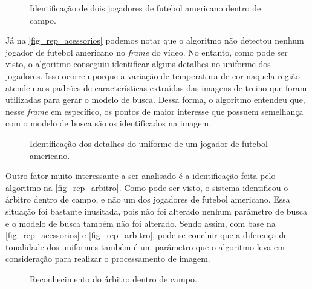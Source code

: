\begin{figure}[ht]
	\caption{\label{fig_rep_dois_jogadores}Identificação de dois jogadores de futebol americano dentro de campo.}
	\begin{center}
	\end{center}
	\centering {}
\end{figure}

Já na \autoref{fig_rep_acessorios} podemos notar que o algoritmo não detectou nenhum jogador de futebol americano no \textit{frame} do vídeo. No entanto, como pode ser visto, o algoritmo conseguiu identificar alguns detalhes no uniforme dos jogadores. Isso ocorreu porque a variação de temperatura de cor naquela região atendeu aos padrões de características extraídas das imagens de treino que foram utilizadas para gerar o modelo de busca. Dessa forma, o algoritmo entendeu que, nesse \textit{frame} em específico, os pontos de maior interesse que possuem semelhança com o modelo de busca são os identificados na imagem.

\begin{figure}[ht]
	\caption{\label{fig_rep_acessorios}Identificação dos detalhes do uniforme de um jogador de futebol americano.}
	\begin{center}
	\end{center}
	\centering {}
\end{figure}

Outro fator muito interessante a ser analisado é a identificação feita pelo algoritmo na \autoref{fig_rep_arbitro}. Como pode ser visto, o sistema identificou o árbitro dentro de campo, e não  um dos jogadores de futebol americano. Essa situação foi bastante inusitada, pois não foi alterado nenhum parâmetro de busca e o modelo de busca também não foi alterado. Sendo assim, com base na \autoref{fig_rep_acessorios} e \autoref{fig_rep_arbitro}, pode-se concluir que a diferença de tonalidade dos uniformes também é um parâmetro que o algoritmo leva em consideração para realizar o processamento de imagem.

\clearpage

\begin{figure}[ht]
	\caption{\label{fig_rep_arbitro}Reconhecimento do árbitro dentro de campo.}
	\begin{center}
	\end{center}
	\centering {}
\end{figure}

